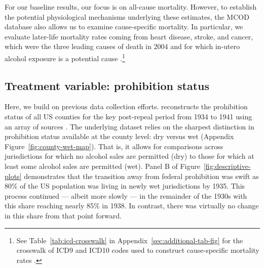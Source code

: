 \documentclass[12pt]{article}
\begin{document}
For our baseline results, our focus is on all-cause mortality. 
However, to establish the potential physiological mechanisms underlying these estimates, the MCOD database also allows us to examine cause-specific mortality. 
In particular, we evaluate later-life mortality rates coming from heart disease, stroke, and cancer, which were the three leading causes of death in 2004  and for which in-utero alcohol exposure is a potential cause .\footnote{See Table~\ref{tab:icd-crosswalk} in Appendix~\ref{sec:additional-tab-fig} for the crosswalk of ICD9 and ICD10 codes used to construct cause-specific mortality rates .}

\subsection{Treatment variable: prohibition status}\label{sec:data-prohibition-status}

Here, we build on previous data collection efforts.  reconstructs the prohibition status of all US counties for the key post-repeal period from 1934 to 1941 using an array of sources . 
The underlying dataset relies on the sharpest distinction in prohibition status available at the county level: dry versus wet (Appendix Figure~\ref{fig:county-wet-map}). That is, it allows for comparisons across jurisdictions for which no alcohol sales are permitted (dry) to those for which at least some alcohol sales are permitted (wet). 
Panel B of Figure~\ref{fig:descriptive-plots} demonstrates that the transition away from federal prohibition was swift as 80\% of the US population was living in newly wet jurisdictions by 1935. 
This process continued — albeit more slowly — in the remainder of the 1930s with this share reaching nearly 85\% in 1938. 
In contrast, there was virtually no change in this share from that point forward. 
\end{document}
